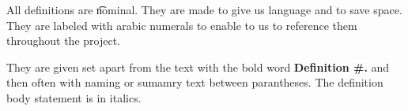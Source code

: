 
All definitions are \t{nominal}.
They are made to give us language and to save space.
They are labeled with arabic numerals to enable to us to reference them throughout the project.

They are given set apart from the text with the bold word \textbf{Definition \#.} and then often with naming or sumamry text between parantheses.
The definition body statement is in italics.

\blankpage
